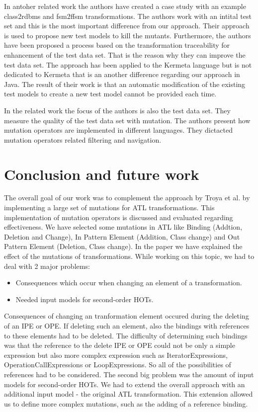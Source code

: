 \documentclass{llncs}
\begin{document}
In antoher related work \cite{Aranega:2014} the authors have created a case study with an example class2rdbms and fsm2ffsm transformations. The authors work with an intital test set and this is the most important difference from our approach. Their approach is used to propose new test models to kill the mutants. Furthermore, the authors have been proposed a process based on the transformation traceability for enhancement of the test data set. That is the reason why they can improve the test data set. The approach has been applied to the Kermeta language but is not dedicated to Kermeta that is an another difference regarding our approach in Java. The result of their work is that an automatic modification of the existing test models to create a new test model
cannot be provided each time.

In the related work \cite{Mottu:2006:MAT:2164453.2164495} the focus of the authors is also the test data set. They measure the quality of the test data set with mutation. The authors present how mutation operators are implemented in
different languages. They dictacted mutation operators related filtering and navigation. 

\section{Conclusion and future work}
The overall goal of our work was to complement the approach by Troya et al. \cite{Bergmayr:2014} by implementing a large set of mutations for ATL transformations. This implementation of mutation operators is discussed and evaluated regarding effectiveness. We have selected some mutations in ATL like Binding (Addtion, Deletion and Change), In Pattern Element (Addition, Class change) and Out Pattern Element (Deletion, Class change). In the paper we have explained the effect of the mutations of transformations.
While working on this topic, we had to deal with 2 major problems:

\begin{itemize}
	\item Consequences which occur when changing an element of a transformation.
	\item Needed input models for second-order HOTs.
\end{itemize}

Consequences of changing an tranformation element occured during the deleting of an IPE or OPE. If deleting such an element, also the bindings with references to these elements had to be deleted. The difficulty of determining such bindings was that the reference to the delete IPE or OPE could not be only a simple expression but also more complex expression such as IteratorExpressions, OperationCallExpressions or LoopExpressions. So all of the possibilities of references had to be considered.
The second big problem was the amount of input models for second-order HOTs.
We had to extend the overall approach with an additional input model - the original ATL transformation. This extension allowed us to define more complex mutations, such as the adding of a reference binding.
\end{document}
